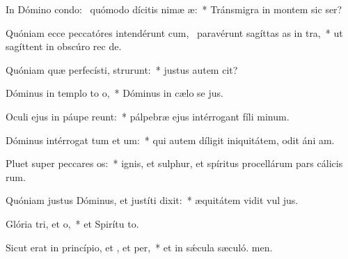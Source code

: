 \item In Dómino condo:~\pscross{} quómodo dícitis nimæ æ:~* Tránsmigra in montem sic ser?
\item Quóniam ecce peccatóres intendérunt cum,~\pscross{} paravérunt sagíttas as in tra,~* ut sagíttent in obscúro rec de.
\item Quóniam quæ perfecísti, strurunt:~* justus autem  cit?
\item Dóminus in templo to o,~* Dóminus in cælo se jus.
\item Oculi ejus in páupe reunt:~* pálpebræ ejus intérrogant fíli minum.
\item Dóminus intérrogat tum et um:~* qui autem díligit iniquitátem, odit áni am.
\item Pluet super peccares os:~* ignis, et sulphur, et spíritus procellárum pars cálicis rum.
\item Quóniam justus Dóminus, et justíti dixit:~* æquitátem vidit vul jus.
\item Glória tri, et o,~* et Spirítu to.
\item Sicut erat in princípio, et , et per,~* et in sǽcula sæculó. men.

